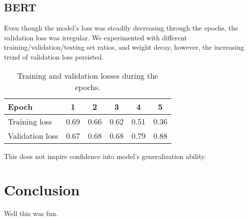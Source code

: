 \documentclass[10pt, a4paper]{article}
\begin{document}
\subsection{BERT}

Even though the model's loss was steadily decreasing through the epochs, the validation loss was irregular. 
We experimented with different training/validation/testing set ratios, and weight decay, however, the increasing trend of validation loss persisted. 

\begin{table}[H]
	\begin{tabular}{|l|c|c|c|c|c|}
    \hline
    Epoch & 1 & 2 & 3 & 4 & 5\\
		\hline
		Training loss & 0.69 & 0.66 & 0.62 & 0.51 & 0.36\\ 
    \hline
		Validation loss & 0.67 & 0.68 & 0.68 & 0.79 & 0.88\\ 
    \hline
	\end{tabular}
	\caption{Training and validation losses during the epochs.}
	\label{losses}
\end{table}

This does not inspire confidence into model's generalization ability.

\section{Conclusion}
Well this was fun.



\end{document}
